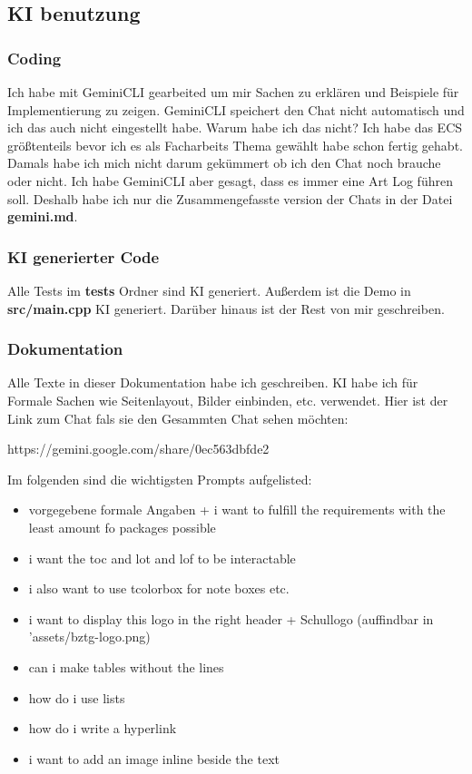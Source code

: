 \documentclass[12pt, a4paper, oneside, ngerman]{scrartcl}
\begin{document}
\subsection{KI benutzung}
\subsubsection{Coding}
Ich habe mit GeminiCLI gearbeited um mir Sachen zu erklären und Beispiele für Implementierung zu zeigen.
GeminiCLI speichert den Chat nicht automatisch und ich das auch nicht eingestellt habe.
Warum habe ich das nicht?
Ich habe das ECS größtenteils bevor ich es als Facharbeits Thema gewählt habe schon fertig gehabt.
Damals habe ich mich nicht darum gekümmert ob ich den Chat noch brauche oder nicht.
Ich habe GeminiCLI aber gesagt, dass es immer eine Art Log führen soll.
Deshalb habe ich nur die Zusammengefasste version der Chats in der Datei \textbf{gemini.md}.

\subsubsection{KI generierter Code}
Alle Tests im \textbf{tests} Ordner sind KI generiert.
Außerdem ist die Demo in \textbf{src/main.cpp} KI generiert.
Darüber hinaus ist der Rest von mir geschreiben.

\newpage
\subsubsection{Dokumentation}
Alle Texte in dieser Dokumentation habe ich geschreiben.
KI habe ich für Formale Sachen wie Seitenlayout, Bilder einbinden, etc. verwendet.
Hier ist der Link zum Chat fals sie den Gesammten Chat sehen möchten:

https://gemini.google.com/share/0ec563dbfde2

Im folgenden sind die wichtigsten Prompts aufgelisted:

\begin{itemize}
	\item vorgegebene formale Angaben + i want to fulfill the requirements with the least amount fo packages possible
	\item i want the toc and lot and lof to be interactable
	\item i also want to use tcolorbox for note boxes etc.
	\item i want to display this logo in the right header + Schullogo (auffindbar in 'assets/bztg-logo.png)
	\item can i make tables without the lines
	\item how do i use lists
	\item how do i write a hyperlink
	\item i want to add an image inline beside the text
\end{itemize}
\end{document}
